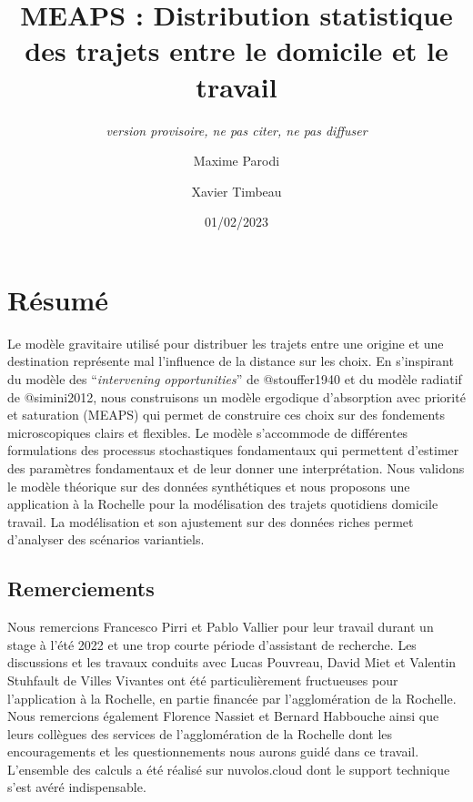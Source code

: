 \documentclass[
  10pt,
  a4paper,
  numbers=noendperiod,
  DIV=9]{scrreprt}
\title{MEAPS : Distribution statistique des trajets entre le domicile et
le travail}
\subtitle{\emph{version provisoire, ne pas citer, ne pas diffuser}}
\author{Maxime Parodi \and Xavier Timbeau}
\date{01/02/2023}
\renewcommand*\contentsname{Table des matières}
\newcommand\contentsname{Table des matières}
\begin{document}
\maketitle
\ifdefined\Shaded\renewenvironment{Shaded}{\begin{tcolorbox}[breakable, interior hidden, frame hidden, enhanced, boxrule=0pt, borderline west={3pt}{0pt}{shadecolor}, sharp corners]}{\end{tcolorbox}}\fi

\renewcommand*\contentsname{Table des matières}
{
\hypersetup{linkcolor=}
\setcounter{tocdepth}{0}
\tableofcontents
}

\hypertarget{ruxe9sumuxe9}{%
\chapter*{Résumé}\label{ruxe9sumuxe9}}


Le modèle gravitaire utilisé pour distribuer les trajets entre une
origine et une destination représente mal l'influence de la distance sur
les choix. En s'inspirant du modèle des ``\emph{intervening
opportunities}'' de @stouffer1940 et du modèle radiatif de @simini2012,
nous construisons un modèle ergodique d'absorption avec priorité et
saturation (MEAPS) qui permet de construire ces choix sur des fondements
microscopiques clairs et flexibles. Le modèle s'accommode de différentes
formulations des processus stochastiques fondamentaux qui permettent
d'estimer des paramètres fondamentaux et de leur donner une
interprétation. Nous validons le modèle théorique sur des données
synthétiques et nous proposons une application à la Rochelle pour la
modélisation des trajets quotidiens domicile travail. La modélisation et
son ajustement sur des données riches permet d'analyser des scénarios
variantiels.

\hypertarget{remerciements}{%
\section*{Remerciements}\label{remerciements}}


Nous remercions Francesco Pirri et Pablo Vallier pour leur travail
durant un stage à l'été 2022 et une trop courte période d'assistant de
recherche. Les discussions et les travaux conduits avec Lucas Pouvreau,
David Miet et Valentin Stuhfault de Villes Vivantes ont été
particulièrement fructueuses pour l'application à la Rochelle, en partie
financée par l'agglomération de la Rochelle. Nous remercions également
Florence Nassiet et Bernard Habbouche ainsi que leurs collègues des
services de l'agglomération de la Rochelle dont les encouragements et
les questionnements nous aurons guidé dans ce travail. L'ensemble des
calculs a été réalisé sur nuvolos.cloud dont le support technique s'est
avéré indispensable.
\end{document}
